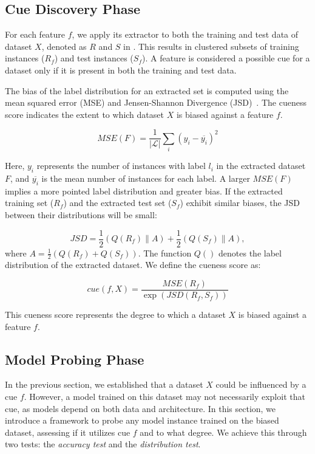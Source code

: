 \subsection{Cue Discovery Phase}
\label{sec:cuenessdiscovery}

For each feature $f$, we apply its extractor to both the 
training and test data of dataset $X$, 
denoted as $R$ and $S$ in . 
This results in clustered subsets of training 
instances ($R_f$) and test instances ($S_f$). 
A feature is considered a possible cue for a 
dataset only if it is present in both the training and test data.

The bias of the label distribution for an extracted set 
is computed using the mean squared error (MSE) 
and Jensen-Shannon Divergence (JSD)~\cite{lin1991divergence}. 
The cueness score indicates the extent 
to which dataset $X$ is biased against a feature $f$.

\begin{equation}
MSE(F) = \frac{1}{|\mathcal{L}|} \sum_i (y_i - \overline{y_i})^2
\end{equation}

Here, $y_i$ represents the number of instances with label $l_i$ in the extracted dataset $F$, and $\overline{y_i}$ is the mean number of instances for each label. A larger $MSE(F)$ implies a more pointed label distribution and greater bias. If the extracted training set ($R_f$) and the extracted test set ($S_f$) exhibit similar biases, 
the JSD between their distributions will be small:

\begin{equation}
JSD = \frac{1}{2}\left (Q(R_f)\parallel A  \right )+\frac{1}{2}\left (Q(S_f)\parallel A  \right ), 
\end{equation}
\noindent where $ A = \frac{1}{2}\left (Q(R_f)+Q(S_f) \right )$. 
The function $Q()$ denotes the label distribution of the extracted dataset. We define the cueness score as:

\begin{equation}
cue(f, X) = \frac{MSE(R_f)}{\exp(JSD(R_f, S_f))}
\end{equation} 

This cueness score represents the degree to which a dataset $X$ is biased against a feature $f$.

\subsection{Model Probing Phase}
\label{sec:modelprobing}
In the previous section, we established that a dataset $X$ could be influenced by a cue $f$. However, a model trained on this dataset may not necessarily exploit that cue, as models depend on both data and architecture. In this section, we introduce a framework to probe any model instance trained on the biased dataset, assessing if it utilizes cue $f$ and to what degree. We achieve this through two tests: the \emph{accuracy test} and the \emph{distribution test}.


